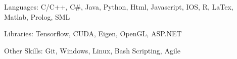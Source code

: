 

\begin{cvskills}

  \cvskill
    {Languages:} %
    {C/C++, C\#, Java, Python, Html, Javascript, IOS, R, LaTex, Matlab, Prolog, SML} %

  \cvskill
    {Libraries:} %
    {Tensorflow, CUDA, Eigen, OpenGL, ASP.NET} %

  \cvskill
    {Other Skills:} %
    {Git, Windows, Linux, Bash Scripting, Agile} %

\end{cvskills}
